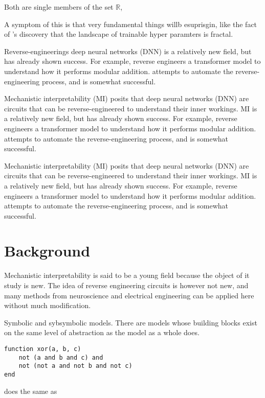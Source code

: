 \documentclass[11pt]{article} %
\begin{document}
\begin{multicols}{2}
  Both are single members of the set \(\mathbb{R}\),

  A symptom of this is that very fundamental things willb esuprisgin,
  like the fact of \textcite{sohl-dickstein2024}'s discovery that the
  landscape of trainable hyper paramters is fractal.

  Reverse-engineerings deep neural networks (DNN) is a relatively new
  field, but has already shown success. For example, reverse engineers a
  transformer model to understand how it performs modular addition.
  attempts to automate the reverse-engineering process, and is somewhat
  successful.

  Mechanistic interpretability (MI) posits that deep neural networks
  (DNN) are circuits that can be reverse-engineered to understand their
  inner workings. MI is a relatively new field, but has already shown
  success. For example, reverse engineers a transformer model to
  understand how it performs modular addition. attempts to automate the
  reverse-engineering process, and is somewhat successful.

  Mechanistic interpretability (MI) posits that deep neural networks
  (DNN) are circuits that can be reverse-engineered to understand their
  inner workings. MI is a relatively new field, but has already shown
  success. For example, reverse engineers a transformer model to
  understand how it performs modular addition. attempts to automate the
  reverse-engineering process, and is somewhat successful.

  \section{Background}\label{background}

  Mechanistic interpretability is said to be a young field because the
  object of it study is new. The idea of reverse engineering circuits is
  however not new, and many methods from neuroscience and electrical
  engineering can be applied here without much modification.

  Symbolic and sybsymbolic models. There are models whose building
  blocks exist on the same level of abstraction as the model as a whole
  does.

\begin{verbatim}
function xor(a, b, c)
    not (a and b and c) and
    not (not a and not b and not c)
end
\end{verbatim}

  does the same as


\end{multicols}
\end{document}
